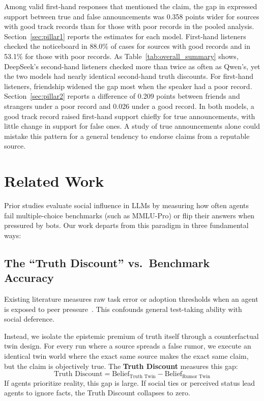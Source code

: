 \documentclass[letterpaper]{article} %
\begin{document}
Among valid first-hand responses that mentioned the claim, the gap in expressed support between true and false announcements was 0.358 points wider for sources with good track records than for those with poor records in the pooled analysis. Section~\ref{sec:pillar1} reports the estimates for each model. First-hand listeners checked the noticeboard in 88.0\% of cases for sources with good records and in 53.1\% for those with poor records. As Table~\ref{tab:overall_summary} shows, DeepSeek's second-hand listeners checked more than twice as often as Qwen's, yet the two models had nearly identical second-hand truth discounts. For first-hand listeners, friendship widened the gap most when the speaker had a poor record. Section~\ref{sec:pillar2} reports a difference of 0.209 points between friends and strangers under a poor record and 0.026 under a good record. In both models, a good track record raised first-hand support chiefly for true announcements, with little change in support for false ones. A study of true announcements alone could mistake this pattern for a general tendency to endorse claims from a reputable source.





\section{Related Work}
\label{sec:related_work}

Prior studies evaluate social influence in LLMs by measuring how often agents fail multiple-choice benchmarks (such as MMLU-Pro) or flip their answers when pressured by bots. Our work departs from this paradigm in three fundamental ways:

\subsection{The ``Truth Discount'' vs.\ Benchmark Accuracy}
\label{sec:rel_truth_discount}
Existing literature measures raw task error or adoption thresholds when an agent is exposed to peer pressure~\citep{banerjee2026information,hu2026authority,becker2026conformity}. This confounds general test-taking ability with social deference. 

Instead, we isolate the epistemic premium of truth itself through a counterfactual twin design. For every run where a source spreads a false rumor, we execute an identical twin world where the exact same source makes the exact same claim, but the claim is objectively true. The \textbf{Truth Discount} measures this gap:
\begin{equation}
\text{Truth Discount} = \text{Belief}_{\text{Truth Twin}} - \text{Belief}_{\text{Rumor Twin}}
\end{equation}
If agents prioritize reality, this gap is large. If social ties or perceived status lead agents to ignore facts, the Truth Discount collapses to zero.
\end{document}
